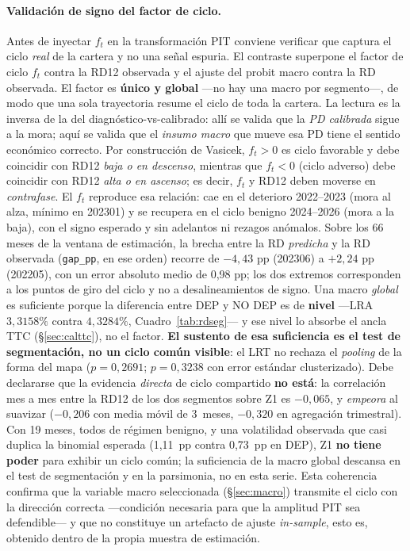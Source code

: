 \documentclass[12pt, a4paper]{article}
\newcommand{\LRA}{\ensuremath{\mathrm{LRA}}}
\newcommand{\ft}{\ensuremath{f_t}}
\begin{document}
\paragraph{Validación de signo del factor de ciclo.} Antes de inyectar
$\ft$ en la transformación PIT conviene verificar que captura el ciclo \emph{real} de la cartera
y no una señal espuria. El contraste superpone el factor de ciclo $\ft$
contra la RD12 observada y el ajuste del probit macro
contra la RD observada. El factor es \textbf{único y global} ---no hay una macro por segmento---,
de modo que una sola trayectoria resume el ciclo de toda la cartera. La lectura es la inversa de
la del diagnóstico-vs-calibrado: allí se valida que la \emph{PD calibrada} sigue a la mora; aquí
se valida que el \emph{insumo macro} que mueve esa PD tiene el sentido económico correcto. Por
construcción de Vasicek, $\ft>0$ es ciclo favorable y debe coincidir con RD12 \emph{baja o en
descenso}, mientras que $\ft<0$ (ciclo adverso) debe coincidir con RD12 \emph{alta o en ascenso};
es decir, $\ft$ y RD12 deben moverse en \emph{contrafase}. El $\ft$ reproduce esa relación:
cae en el deterioro 2022--2023 (mora al alza, mínimo en 202301) y se recupera en el ciclo
benigno 2024--2026 (mora a la baja), con el signo esperado y sin adelantos ni rezagos anómalos.
Sobre los 66 meses de la ventana de estimación, la brecha entre la RD \emph{predicha} y la RD
observada (\texttt{gap\_pp}, en ese orden) recorre de $-4{,}43$ pp (202306) a $+2{,}24$ pp (202205),
con un error absoluto medio de 0,98 pp; los dos extremos corresponden a los puntos de giro del ciclo
y no a desalineamientos de signo. Una macro \emph{global} es
suficiente porque la diferencia entre DEP y NO DEP es de \textbf{nivel} ---\LRA{} $3{,}3158\%$
contra $4{,}3284\%$, Cuadro~\ref{tab:rdseg}--- y ese nivel lo absorbe el ancla TTC
(\S\ref{sec:calttc}), no el factor. \textbf{El sustento de esa suficiencia es el test de
segmentación, no un ciclo común visible}: el LRT no rechaza el \emph{pooling} de la forma del mapa
($p=0{,}2691$; $p=0{,}3238$ con error estándar clusterizado). Debe declararse que la evidencia
\emph{directa} de ciclo compartido \textbf{no está}: la correlación mes a mes entre la RD12 de los
dos segmentos sobre Z1 es $-0{,}065$, y \emph{empeora} al suavizar ($-0{,}206$ con media móvil de
3~meses, $-0{,}320$ en agregación trimestral). Con 19 meses, todos de régimen benigno, y una
volatilidad observada que casi duplica la binomial esperada (1,11~pp contra 0,73~pp en DEP), Z1
\textbf{no tiene poder} para exhibir un ciclo común; la suficiencia de la macro global descansa en
el test de segmentación y en la parsimonia, no en esta serie. Esta
coherencia confirma que la variable macro seleccionada (\S\ref{sec:macro}) transmite el ciclo con la
dirección correcta ---condición necesaria para que la amplitud PIT sea defendible--- y que no
constituye un artefacto de ajuste \emph{in-sample}, esto es, obtenido dentro de la propia muestra de
estimación.
\end{document}
